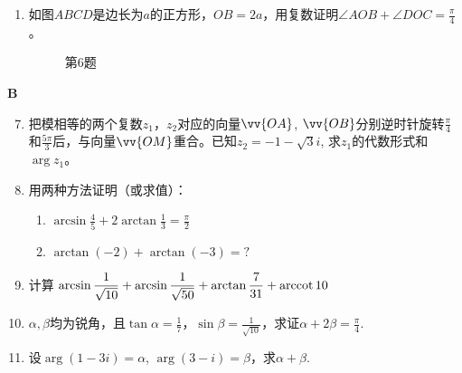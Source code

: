 \begin{enumerate}
\item 如图$ABCD$是边长为$a$的正方形，$OB=2a$，用复数证明$\angle AOB+\angle DOC=\frac{\pi}{4}$。
\begin{figure}[htp]
    \centering
{}
    \caption*{第6题}
\end{figure}
\end{enumerate}


\begin{center}
    \bfseries B
\end{center}

\begin{enumerate}\setcounter{enumi}{6}
\item 把模相等的两个复数$z_1$，$z_2$对应的向量$\vv{OA}$, $\vv{OB}$分别逆时针旋转$\frac{\pi}{4}$和$\frac{5\pi}{3}$后，与向量$\vv{OM}$重合。已知$z_2=-1-\sqrt{3}i$, 求$z_1$的代数形式和$\arg z_1$。
\item 用两种方法证明（或求值）：
\begin{enumerate}[(1)]
    \item $\arcsin\frac{4}{5}+2\arctan\frac{1}{3}=\frac{\pi}{2}$
    \item $\arctan(-2)+\arctan(-3)=?$
\end{enumerate}

\item 计算
$\arcsin\frac{1}{\sqrt{10}}+\arcsin\frac{1}{\sqrt{50}}+\arctan\frac{7}{31}+{\rm arccot\,}10$

\item $\alpha,\beta$均为锐角，且$\tan\alpha=\frac{1}{7}$，$\sin\beta=\frac{1}{\sqrt{10}}$，求证$\alpha+2\beta=\frac{\pi}{4}$.
\item 设$\arg(1-3i)=\alpha$, $\arg(3-i)=\beta$，求$\alpha+\beta$.
\end{enumerate}
